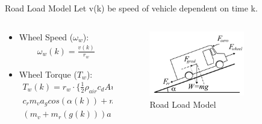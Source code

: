 \documentclass{beamer}
\begin{document}
\begin{frame}{Road Load Model}
Let v(k) be speed of vehicle dependent on time k.

\begin{columns}
\begin{column}{0.5\textwidth}
\begin{itemize}
    \item Wheel Speed ($\omega_w$): \\ \begin{align*}
        \omega_w(k) = \frac{v(k)}{r_w}
    \end{align*}
    
    \item Wheel Torque ($T_w$): \\ \begin{align*}
T_w(k) = r_w \cdot \bigg\{\frac{1}{2}\rho_{air}c_d Av^2(k) + \\c_r m_v a_g  cos(\alpha(k)) + m_v a_g sin(\alpha(k))  + \\(m_v +m_r(g(k))) a(k)\bigg\}
\end{align*}
\end{itemize}

\end{column}
\begin{column}{0.5\textwidth}
    \begin{figure}
    \centering
        \includegraphics[width=0.7\textwidth]{road load model.jpeg}
        \caption{Road Load Model}
    \end{figure}
\end{column}
\end{columns}
    
\end{frame}
\end{document}
